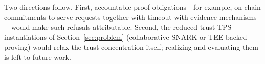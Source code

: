 Two directions follow.
First, accountable proof obligations---for example, on-chain commitments to serve requests together with timeout-with-evidence mechanisms---would make such refusals attributable.
Second, the reduced-trust TPS instantiations of Section~\ref{sec:problem} (collaborative-SNARK or TEE-backed proving) would relax the trust concentration itself; realizing and evaluating them is left to future work.
